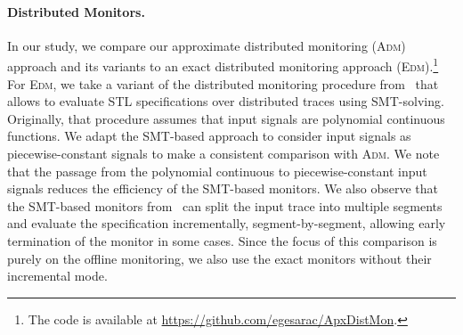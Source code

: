 \paragraph*{Distributed Monitors.}
In our study, we compare our approximate distributed monitoring (\textsc{Adm}) approach and its variants to an exact distributed monitoring approach (\textsc{Edm}).\footnote[1]{The code is available at \url{https://github.com/egesarac/ApxDistMon}.}
For \textsc{Edm}, we take a variant of the distributed monitoring procedure from~\cite{MomtazAB23} that allows to evaluate STL specifications over distributed traces using SMT-solving.
Originally, that procedure assumes that input signals are polynomial continuous functions.
We adapt the SMT-based approach to consider input signals as piecewise-constant signals to make a consistent comparison with \textsc{Adm}.
We note that the passage from the polynomial continuous to piecewise-constant input signals reduces the efficiency of the SMT-based monitors.
We also observe that the SMT-based monitors from~\cite{MomtazAB23} can split the input trace into multiple segments and evaluate the specification incrementally, segment-by-segment, allowing early termination of the monitor in some cases.
Since the focus of this comparison is purely on the offline monitoring, we also use the exact monitors without their incremental mode.


